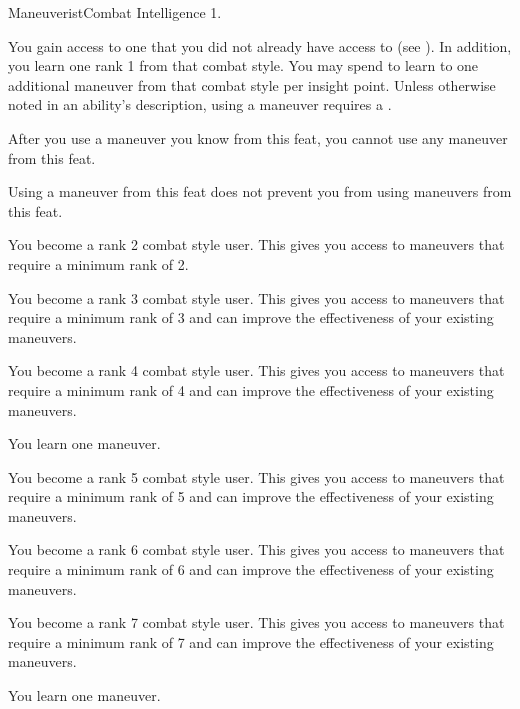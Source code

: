     \begin{feat}{Maneuverist}{Combat}
        \featpre Intelligence 1.

         You gain access to one  that you did not already have access to (see ).
        In addition, you learn one rank 1  from that combat style.
        You may spend  to learn to one additional maneuver from that combat style per insight point.
        Unless otherwise noted in an ability's description, using a maneuver requires a .

        After you use a maneuver you know from this feat, you  cannot use any maneuver from this feat.

         Using a maneuver from this feat does not prevent you from using maneuvers from this feat.

         You become a rank 2 combat style user.
        This gives you access to maneuvers that require a minimum rank of 2.

         You become a rank 3 combat style user.
        This gives you access to maneuvers that require a minimum rank of 3 and can improve the effectiveness of your existing maneuvers.

         You become a rank 4 combat style user.
        This gives you access to maneuvers that require a minimum rank of 4 and can improve the effectiveness of your existing maneuvers.

         You learn one maneuver.

         You become a rank 5 combat style user.
        This gives you access to maneuvers that require a minimum rank of 5 and can improve the effectiveness of your existing maneuvers.

         You become a rank 6 combat style user.
        This gives you access to maneuvers that require a minimum rank of 6 and can improve the effectiveness of your existing maneuvers.

         You become a rank 7 combat style user.
        This gives you access to maneuvers that require a minimum rank of 7 and can improve the effectiveness of your existing maneuvers.

         You learn one maneuver.
    \end{feat}

